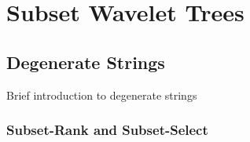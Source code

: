 
\chapter{Subset Wavelet Trees} %

\label{ch:Chapter4} %

\section{Degenerate Strings}
Brief introduction to degenerate strings
\subsection{Subset-Rank and Subset-Select}



